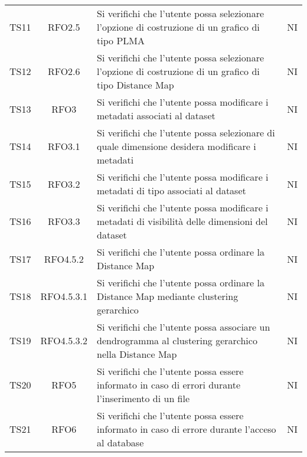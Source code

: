 \documentclass[../piano_di_qualifica.tex]{subfiles}
\begin{document}
\begin{center}
\begin{longtable}{|c|c|p{8cm}|c|}
		TS11              & RFO2.5                 & Si verifichi che l'utente possa selezionare l'opzione di costruzione di un grafico di tipo PLMA                           & NI                         \\
		TS12              & RFO2.6                 & Si verifichi che l'utente possa selezionare l'opzione di costruzione di un grafico di tipo Distance Map                   & NI                         \\
		TS13              & RFO3                   & Si verifichi che l'utente possa modificare i metadati associati al dataset                                                & NI                         \\
		TS14              & RFO3.1                 & Si verifichi che l'utente possa selezionare di quale dimensione desidera modificare i metadati                            & NI                         \\
		TS15              & RFO3.2                 & Si verifichi che l'utente possa modificare i metadati di tipo associati al dataset                                        & NI                         \\
		TS16              & RFO3.3                 & Si verifichi che l'utente possa modificare i metadati di visibilità delle dimensioni del dataset                          & NI                         \\
		TS17              & RFO4.5.2               & Si verifichi che l'utente possa ordinare la Distance Map                                                                  & NI                         \\
		TS18              & RFO4.5.3.1             & Si verifichi che l'utente possa ordinare la Distance Map mediante clustering gerarchico                                   & NI                         \\
		TS19              & RFO4.5.3.2             & Si verifichi che l'utente possa associare un dendrogramma al clustering gerarchico nella Distance Map                     & NI                         \\
		TS20              & RFO5                   & Si verifichi che l'utente possa essere informato in caso di errori durante l'inserimento di un file                       & NI                         \\
		TS21              & RFO6                   & Si verifichi che l'utente possa essere informato in caso di errore durante l'acceso al database                           & NI                         \\

\end{longtable}
\end{center}
\end{document}
